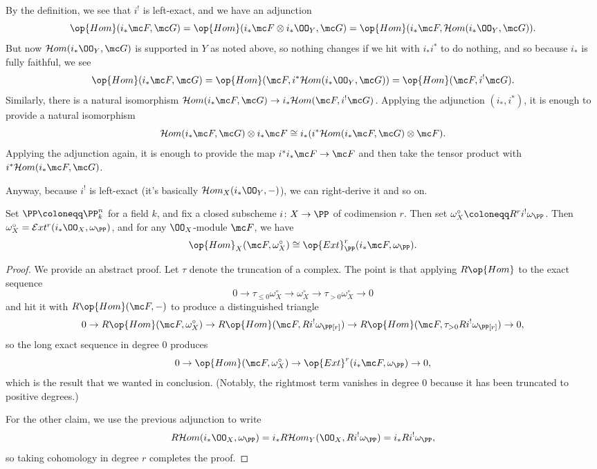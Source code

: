 \documentclass[../notes.tex]{subfiles}
\begin{document}
By the definition, we see that $i^!$ is left-exact, and we have an adjunction
\[\op{Hom}(i_*\mc F,\mc G)=\op{Hom}(i_*\mc F\otimes i_*\OO_Y,\mc G)=\op{Hom}(i_*\mc F,\mathcal Hom(i_*\OO_Y,\mc G)).\]
But now $\mathcal Hom(i_*\OO_Y,\mc G)$ is supported in $Y$ as noted above, so nothing changes if we hit with $i_*i^*$ to do nothing, and so because $i_*$ is fully faithful, we see
\[\op{Hom}(i_*\mc F,\mc G)=\op{Hom}(\mc F,i^*\mathcal Hom(i_*\OO_Y,\mc G))=\op{Hom}(\mc F,i^!\mc G).\]
Similarly, there is a natural isomorphism $\mathcal Hom(i_*\mc F,\mc G)\to i_*\mathcal Hom(\mc F,i^!\mc G)$. Applying the adjunction $(i_*,i^*)$, it is enough to provide a natural isomorphism
\[\mathcal Hom(i_*\mc F,\mc G)\otimes i_*\mc F\cong i_*(i^*\mathcal Hom(i_*\mc F,\mc G)\otimes\mc F).\]
Applying the adjunction again, it is enough to provide the map $i^*i_*\mc F\to\mc F$ and then take the tensor product with $i^*\mathcal Hom(i_*\mc F,\mc G)$.

Anyway, because $i^!$ is left-exact (it's basically $\mathcal Hom_X(i_*\OO_Y,-)$), we can right-derive it and so on.
\begin{lemma} \label{lem:almost-serre-duality}
	Set $\PP\coloneqq\PP^n_k$ for a field $k$, and fix a closed subscheme $i\colon X\to\PP$ of codimension $r$. Then set $\omega^\circ_X\coloneqq R^ri^!\omega_\PP$. Then $\omega^\circ_X=\mathcal Ext^r(i_*\OO_X,\omega_\PP)$, and for any $\OO_X$-module $\mc F$, we have
	\[\op{Hom}_X(\mc F,\omega_X^\circ)\cong\op{Ext}^r_\PP(i_*\mc F,\omega_\PP).\]
\end{lemma}
\begin{proof}
	We provide an abstract proof. Let $\tau$ denote the truncation of a complex. The point is that applying $R\op{Hom}$ to the exact sequence
	\[0\to\tau_{\le0}\omega_X^\circ\to\omega_X^\circ\to\tau_{>0}\omega_X^\circ\to0\]
	and hit it with $R\op{Hom}(\mc F,-)$ to produce a distinguished triangle
	\[0\to R\op{Hom}(\mc F,\omega_X^\circ)\to R\op{Hom}(\mc F,Ri^!\omega_\PP[r])\to R\op{Hom}(\mc F,\tau_{>0}Ri^!\omega_\PP[r])\to0,\]
	so the long exact sequence in degree $0$ produces
	\[0\to\op{Hom}(\mc F,\omega_X^\circ)\to\op{Ext}^r(i_*\mc F,\omega_\PP)\to0,\]
	which is the result that we wanted in conclusion. (Notably, the rightmost term vanishes in degree $0$ because it has been truncated to positive degrees.)

	For the other claim, we use the previous adjunction to write
	\[R\mathcal Hom(i_*\OO_X,\omega_\PP)=i_*R\mathcal Hom_Y(\OO_X,Ri^!\omega_\PP)=i_*Ri^!\omega_\PP,\]
	so taking cohomology in degree $r$ completes the proof.
\end{proof}
\end{document}
